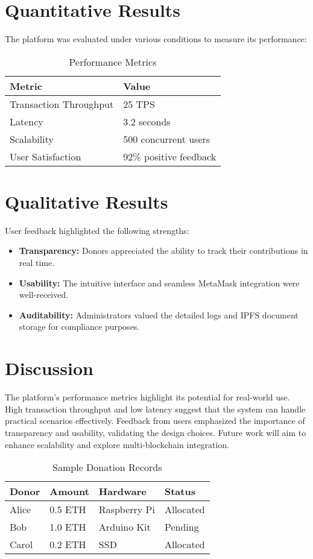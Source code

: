 \documentclass[a4paper,12pt]{report}
\begin{document}
\section{Quantitative Results}
The platform was evaluated under various conditions to measure its performance:
\begin{table}[ht]
\caption{Performance Metrics}
\centering
\begin{tabular}{|l|l|}
\hline
\textbf{Metric} & \textbf{Value} \\
\hline
Transaction Throughput & 25 TPS \\
Latency & 3.2 seconds \\
Scalability & 500 concurrent users \\
User Satisfaction & 92\% positive feedback \\
\hline
\end{tabular}
\label{tab:performance}
\end{table}

\section{Qualitative Results}
User feedback highlighted the following strengths:
\begin{itemize}
    \item \textbf{Transparency:} Donors appreciated the ability to track their contributions in real time.
    \item \textbf{Usability:} The intuitive interface and seamless MetaMask integration were well-received.
    \item \textbf{Auditability:} Administrators valued the detailed logs and IPFS document storage for compliance purposes.
\end{itemize}

\section{Discussion}
The platform’s performance metrics highlight its potential for real-world use. High transaction throughput and low latency suggest that the system can handle practical scenarios effectively. Feedback from users emphasized the importance of transparency and usability, validating the design choices. Future work will aim to enhance scalability and explore multi-blockchain integration.

\begin{table}[ht]
\caption{Sample Donation Records}
\centering
\begin{tabular}{|l|l|l|l|}
\hline
Donor & Amount & Hardware & Status \\
\hline
Alice & 0.5 ETH & Raspberry Pi & Allocated \\
Bob & 1.0 ETH & Arduino Kit & Pending \\
Carol & 0.2 ETH & SSD & Allocated \\
\hline
\end{tabular}
\label{tab:donations}
\end{table}
\end{document}

